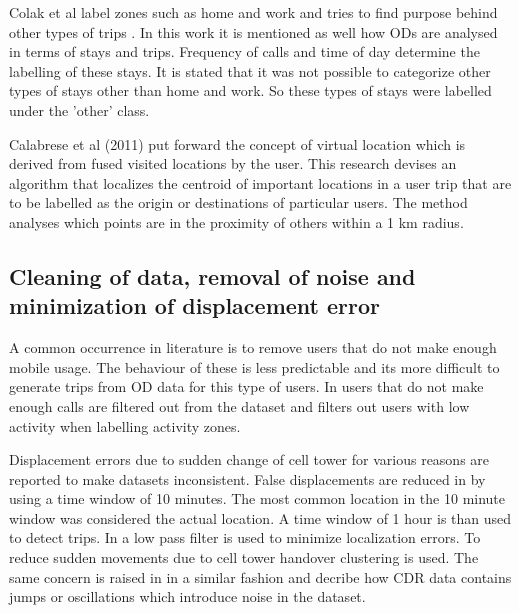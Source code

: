 \documentclass[12pt, a4paper]{report}
\theoremstyle{definition}
\theoremstyle{definition}%
\theoremstyle{definition}%
\theoremstyle{definition}%
\theoremstyle{definition}%
\theoremstyle{definition}%
\begin{document}
Colak et al label zones such as home and work and tries to find purpose behind other types of trips \cite{Colak2015}. In this work it is mentioned as well how ODs are analysed in terms of stays and trips. Frequency of calls and time of day determine the labelling of these stays. It is stated that it was not possible to categorize other types of stays other than home and work. So these types of stays were labelled under the 'other' class.

Calabrese et al (2011) put forward the concept of virtual location which is derived from fused visited locations by the user\cite{Calabrese2011}. This research devises an algorithm that localizes the centroid of important locations in a user trip that are to be labelled as the origin or destinations of particular users. The method analyses which points are in the proximity of others within a 1 km radius. 

 


\subsection{Cleaning of data, removal of noise and minimization of displacement error} \label{subsection: data_processing}
A common occurrence in literature is to remove users that do not make enough mobile usage. The behaviour of these is less predictable and its more difficult to generate trips from OD data for this type of users. In \cite{Toole2015} users that do not make enough calls are filtered out from the dataset and \cite{Colak2015} filters out users with low activity when labelling activity zones.

Displacement errors due to sudden change of cell tower for various reasons are reported to make datasets inconsistent. False displacements are reduced in \cite{Iqbal2014} by using a time window of 10 minutes. The most common location in the 10 minute window was considered the actual location. A time window of 1 hour is than used to detect trips. In \cite{Calabrese2011} a low pass filter is used to minimize localization errors. To reduce sudden movements due to cell tower handover clustering is used. The same concern is raised in \cite{Colak2015} in a similar fashion and decribe how CDR data contains jumps or oscillations which introduce noise in the dataset. 
\end{document}
